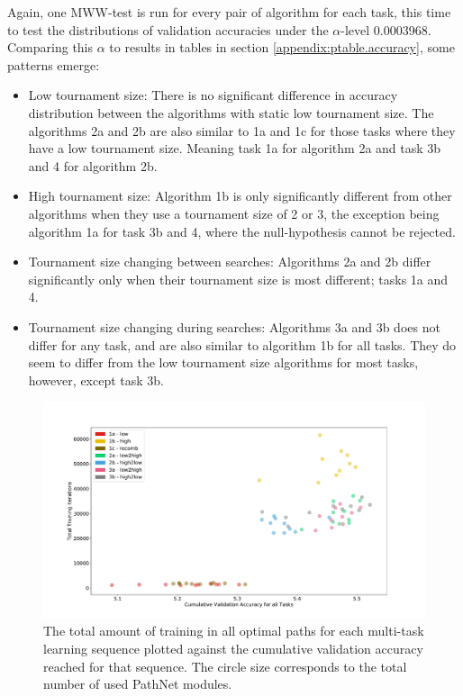 Again, one MWW-test is run for every pair of algorithm for each task, this time to test the distributions of validation accuracies under the \(\alpha\)-level 0.0003968. Comparing this \(\alpha\) to results in tables in section \ref{appendix:ptable.accuracy}, some patterns emerge: 
\begin{itemize}
    \item Low tournament size: There is no significant difference in accuracy distribution between the algorithms with static low tournament size. The algorithms 2a and 2b are also similar to 1a and 1c for those tasks where they have a low tournament size. Meaning task 1a for algorithm 2a and task 3b and 4 for algorithm 2b. 
    \item High tournament size: Algorithm 1b is only significantly different from other algorithms when they use a tournament size of 2 or 3, the exception being algorithm 1a for task 3b and 4, where the null-hypothesis cannot be rejected. 
    \item Tournament size changing between searches: Algorithms 2a and 2b differ significantly only when their tournament size is most different; tasks 1a and 4. 
    \item Tournament size changing during searches: Algorithms 3a and 3b does not differ for any task, and are also similar to algorithm 1b for all tasks. They do seem to differ from the low tournament size algorithms for most tasks, however, except task 3b. 
\end{itemize}

\begin{figure}
    \includegraphics[width=1.2\textwidth,center]{Chapters/4.Experiments/exp2/figures/inuse/Training_value.pdf}
    \caption[Training vs cumulative accuracy plot]{The total amount of training in all optimal paths for each multi-task learning sequence plotted against the cumulative validation accuracy reached for that sequence. The circle size corresponds to the total number of used PathNet modules.}
    \label{fig:search.training_value}
\end{figure}

